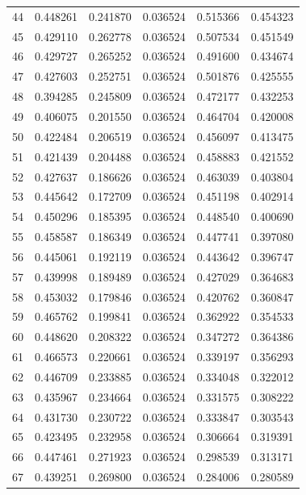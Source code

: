 \documentclass[a4paper, 12pt]{article}
\begin{document}
\begin{tabularx}{\linewidth}{|X|X|X|X|X|X|}
        44 & 0.448261 & 0.241870 & 0.036524 & 0.515366 & 0.454323 \\
        45 & 0.429110 & 0.262778 & 0.036524 & 0.507534 & 0.451549 \\
        46 & 0.429727 & 0.265252 & 0.036524 & 0.491600 & 0.434674 \\
        47 & 0.427603 & 0.252751 & 0.036524 & 0.501876 & 0.425555 \\
        48 & 0.394285 & 0.245809 & 0.036524 & 0.472177 & 0.432253 \\
        49 & 0.406075 & 0.201550 & 0.036524 & 0.464704 & 0.420008 \\
        50 & 0.422484 & 0.206519 & 0.036524 & 0.456097 & 0.413475 \\
        51 & 0.421439 & 0.204488 & 0.036524 & 0.458883 & 0.421552 \\
        52 & 0.427637 & 0.186626 & 0.036524 & 0.463039 & 0.403804 \\
        53 & 0.445642 & 0.172709 & 0.036524 & 0.451198 & 0.402914 \\
        54 & 0.450296 & 0.185395 & 0.036524 & 0.448540 & 0.400690 \\
        55 & 0.458587 & 0.186349 & 0.036524 & 0.447741 & 0.397080 \\
        56 & 0.445061 & 0.192119 & 0.036524 & 0.443642 & 0.396747 \\
        57 & 0.439998 & 0.189489 & 0.036524 & 0.427029 & 0.364683 \\
        58 & 0.453032 & 0.179846 & 0.036524 & 0.420762 & 0.360847 \\
        59 & 0.465762 & 0.199841 & 0.036524 & 0.362922 & 0.354533 \\
        60 & 0.448620 & 0.208322 & 0.036524 & 0.347272 & 0.364386 \\
        61 & 0.466573 & 0.220661 & 0.036524 & 0.339197 & 0.356293 \\
        62 & 0.446709 & 0.233885 & 0.036524 & 0.334048 & 0.322012 \\
        63 & 0.435967 & 0.234664 & 0.036524 & 0.331575 & 0.308222 \\
        64 & 0.431730 & 0.230722 & 0.036524 & 0.333847 & 0.303543 \\
        65 & 0.423495 & 0.232958 & 0.036524 & 0.306664 & 0.319391 \\
        66 & 0.447461 & 0.271923 & 0.036524 & 0.298539 & 0.313171 \\
        67 & 0.439251 & 0.269800 & 0.036524 & 0.284006 & 0.280589 \\

\end{tabularx}
\end{document}
